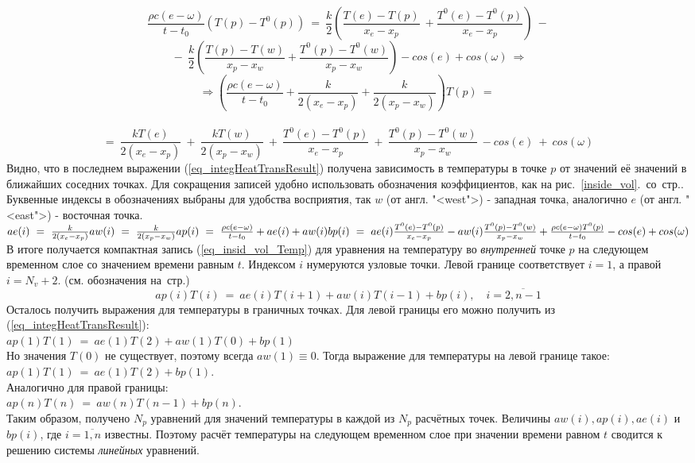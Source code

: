 \documentclass[oneside, final, 14pt]{report}
\begin{document}
\[
\frac{\rho c (e - \omega)}{t - t_0}\left(T(p) - T^0(p)\right) 
\ = \
\frac{k}{2}\left( \frac{T(e)-T(p)}{x_e - x_p} \
+ \frac{T^0(e)-T^0(p)}{x_e - x_p}\right) \ -\]
\[
\ - \
\frac{k}{2}\left( \frac{T(p)-T(w)}{x_p - x_{w}} + \frac{T^0(p)-T^0(w)}{x_p - x_{w}}\right) - cos(e) + cos(\omega) \ \Rightarrow\]
\[ \Rightarrow
\left(\frac{\rho c (e - \omega)}{t - t_0} + \frac{k}{2(x_e - x_p)} + \frac{k}{2(x_p - x_w)} \right)T(p) 
\ = \ \] \\
\begin{equation}
= \ \frac{kT(e)}{2(x_e - x_p)}
\ + \
\frac{kT(w)}{2(x_p - x_w)} 
\ + \
\frac{T^0(e)-T^0(p)}{x_e - x_p}
\ + \
\frac{T^0(p)-T^0(w)}{x_p - x_w} \
 -cos(e) \ + \ cos(\omega)
\label{eq_integHeatTransResult}
\end{equation}
Видно, что в последнем выражении (\ref{eq_integHeatTransResult}) получена зависимость в температуры в точке $p$ от значений её значений в ближайших соседних точках. Для сокращения записей удобно использовать обозначения коэффициентов, как на рис.~\ref{inside_vol}.~со~стр.\pageref{inside_vol}. Буквенные индексы в обозначениях выбраны для удобства восприятия, так $w$ (от англ. "<west">) - западная точка, аналогично $e$ (от англ. "<east">) - восточная точка. \\
\( ae(i) \ = \ \frac{k}{2(x_e - x_p)} \\
 aw(i) \ = \ \frac{k}{2(x_p - x_w)}  \\
 ap(i) \ = \ \frac{\rho c (e - \omega)}{t - t_0} + ae(i) + aw(i)  \\
 bp(i) \ = \ ae(i)\frac{T^0(e)-T^0(p)}{x_e - x_p} - aw(i)\frac{T^0(p)-T^0(w)}{x_p - x_w} + \frac{\rho c (e - \omega)T^0(p)}{t - t_0} -cos(e) + cos(\omega) \)
\\
В итоге получается компактная запись (\ref{eq_insid_vol_Temp}) для уравнения на температуру во \emph{внутренней} точке $p$ на следующем временном слое со значением времени равным $t$. Индексом $i$ нумеруются узловые точки. Левой границе соответствует $i=1$, а правой $i=N_v+2$. (см. обозначения на~стр.\pageref{FVA_defenitions})
\begin{equation}
 ap(i)T(i) \ = \ ae(i)T(i+1) + aw(i)T(i-1) + bp(i), \quad i = \overline{2, n-1}
 \label{eq_insid_vol_Temp}
\end{equation}
Осталось получить выражения для температуры в граничных точках. 
Для левой границы его можно получить из (\ref{eq_integHeatTransResult}): 
\\
\( ap(1)T(1) \ = \ ae(1)T(2) + aw(1)T(0) + bp(1) 
\label{eq_leftBounder_eq} \) \\
Но значения $T(0)$ не существует, поэтому всегда $aw(1) \equiv 0$.
Тогда выражение для температуры на левой границе такое: \\
\(ap(1)T(1) \ = \ ae(1)T(2) + bp(1)\). \\
Аналогично для правой границы: \\
\(ap(n)T(n) \ = \ aw(n)T(n-1) + bp(n)\). \\
Таким образом, получено $N_p$ уравнений для значений температуры в каждой из $N_p$ расчётных точек. Величины $aw(i), ap(i), ae(i)$ и $bp(i)$, где $i=\overline{1, n}$ известны. Поэтому расчёт температуры на следующем временном слое при значении времени равном $t$ сводится к решению системы \emph{линейных} уравнений. 
\end{document}

